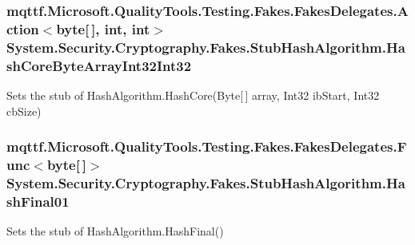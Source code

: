 \hypertarget{class_system_1_1_security_1_1_cryptography_1_1_fakes_1_1_stub_hash_algorithm_a63a7d6edcf4a3b6f53e245909654c777}{
\subsubsection[{Hash\-Core\-Byte\-Array\-Int32\-Int32}]{\setlength{\rightskip}{0pt plus 5cm}mqttf.\-Microsoft.\-Quality\-Tools.\-Testing.\-Fakes.\-Fakes\-Delegates.\-Action$<$byte\mbox{[}$\,$\mbox{]}, int, int$>$ System.\-Security.\-Cryptography.\-Fakes.\-Stub\-Hash\-Algorithm.\-Hash\-Core\-Byte\-Array\-Int32\-Int32}}\label{class_system_1_1_security_1_1_cryptography_1_1_fakes_1_1_stub_hash_algorithm_a63a7d6edcf4a3b6f53e245909654c777}


Sets the stub of Hash\-Algorithm.\-Hash\-Core(\-Byte\mbox{[}$\,$\mbox{]} array, Int32 ib\-Start, Int32 cb\-Size)

\hypertarget{class_system_1_1_security_1_1_cryptography_1_1_fakes_1_1_stub_hash_algorithm_a8668ee3bdfd3ebafd580a426f74b9742}{
\subsubsection[{Hash\-Final01}]{\setlength{\rightskip}{0pt plus 5cm}mqttf.\-Microsoft.\-Quality\-Tools.\-Testing.\-Fakes.\-Fakes\-Delegates.\-Func$<$byte\mbox{[}$\,$\mbox{]}$>$ System.\-Security.\-Cryptography.\-Fakes.\-Stub\-Hash\-Algorithm.\-Hash\-Final01}}\label{class_system_1_1_security_1_1_cryptography_1_1_fakes_1_1_stub_hash_algorithm_a8668ee3bdfd3ebafd580a426f74b9742}


Sets the stub of Hash\-Algorithm.\-Hash\-Final()

